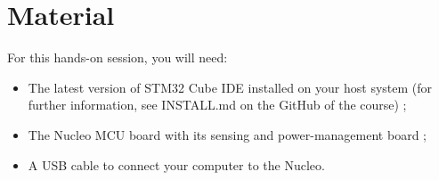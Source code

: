 \section*{Material}

For this hands-on session, you will need:
\begin{itemize}
    \item The latest version of STM32 Cube IDE installed on your host system (for further information, see INSTALL.md on the GitHub of the course) ;
    \item The Nucleo MCU board with its sensing and power-management board ;
    \item A USB cable to connect your computer to the Nucleo.
\end{itemize}
